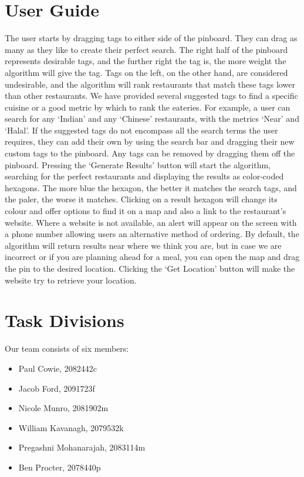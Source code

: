 \documentclass[10pt,a4paper]{article}
\begin{document}
\section*{User Guide}

The user starts by dragging tags to either side of the pinboard. They can drag as many as they like to create their perfect search. The right half of the pinboard represents desirable tags, and the further right the tag is, the more weight the algorithm will give the tag. Tags on the left, on the other hand, are considered undesirable, and the algorithm will rank restaurants that match these tags lower than other restaurants. We have provided several suggested tags to find a specific cuisine or a good metric by which to rank the eateries. For example, a user can search for any ‘Indian’ and any ‘Chinese’ restaurants, with the metrics ‘Near’ and ‘Halal’. If the suggested tags do not encompass all the search terms the user requires, they can add their own by using the search bar and dragging their new custom tags to the pinboard. Any tags can be removed by dragging them off the pinboard. Pressing the ‘Generate Results’ button will start the algorithm, searching for the perfect restaurants and displaying the results as color-coded hexagons. The more blue the hexagon, the better it matches the search tags, and the paler, the worse it matches. Clicking on a result hexagon will change its colour and offer options to find it on a map and also a link to the restaurant’s website. Where a website is not available, an alert will appear on the screen with a phone  number allowing users an alternative method of ordering. By default, the algorithm will return results near where we think you are, but in case we are incorrect or if you are planning ahead for a meal, you can open the map and drag the pin to the desired location. Clicking the ‘Get Location’ button will make the website try to retrieve your location. 

\section*{Task Divisions}

Our team consists of six members:
\begin{itemize}
	\item Paul Cowie, 2082442c
	\item Jacob Ford, 2091723f
	\item Nicole Munro, 2081902m
	\item William Kavanagh, 2079532k
	\item Pregashni Mohanarajah, 2083114m
	\item Ben Procter, 2078440p
\end{itemize}
\end{document}
